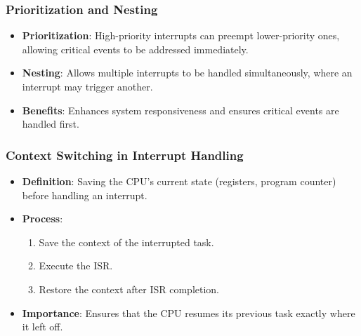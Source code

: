 \begin{frame}
    \frametitle{Prioritization and Nesting}

    \begin{itemize}
        \item \textbf{Prioritization}: High-priority interrupts can preempt lower-priority ones, allowing critical events to be addressed immediately.
        \item \textbf{Nesting}: Allows multiple interrupts to be handled simultaneously, where an interrupt may trigger another.
        \item \textbf{Benefits}: Enhances system responsiveness and ensures critical events are handled first.
    \end{itemize}
\end{frame}

\begin{frame}
    \frametitle{Context Switching in Interrupt Handling}

    \begin{itemize}
        \item \textbf{Definition}: Saving the CPU's current state (registers, program counter) before handling an interrupt.
        \item \textbf{Process}:
            \begin{enumerate}
                \item Save the context of the interrupted task.
                \item Execute the ISR.
                \item Restore the context after ISR completion.
            \end{enumerate}
        \item \textbf{Importance}: Ensures that the CPU resumes its previous task exactly where it left off.
    \end{itemize}
\end{frame}